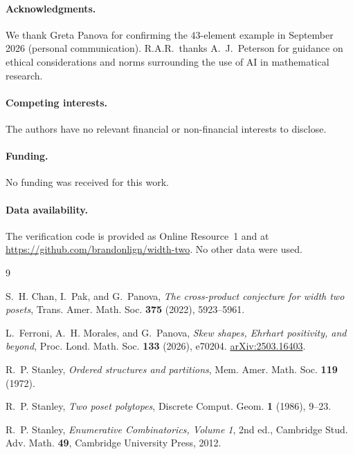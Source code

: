 \documentclass[11pt]{amsart}
\theoremstyle{remark}
\numberwithin{equation}{section}
\begin{document}
\paragraph{Acknowledgments.} We thank Greta Panova for confirming the
$43$-element example in September 2026 (personal communication). R.A.R.\ thanks
A.~J.~Peterson for guidance on ethical considerations and norms surrounding the
use of AI in mathematical research.

\paragraph{Competing interests.} The authors have no relevant financial or non-financial
interests to disclose.

\paragraph{Funding.} No funding was received for this work.

\paragraph{Data availability.} The verification code is provided as Online
Resource~1 and at \url{https://github.com/brandonlign/width-two}. No other data
were used.

\begin{thebibliography}{9}

S.~H. Chan, I.~Pak, and G.~Panova,
\emph{The cross-product conjecture for width two posets},
Trans. Amer. Math. Soc. \textbf{375} (2022), 5923--5961.

L.~Ferroni, A.~H. Morales, and G.~Panova,
\emph{Skew shapes, Ehrhart positivity, and beyond},
Proc. Lond. Math. Soc. \textbf{133} (2026), e70204.
\href{https://arxiv.org/abs/2503.16403}{arXiv:2503.16403}.

R.~P. Stanley,
\emph{Ordered structures and partitions},
Mem. Amer. Math. Soc. \textbf{119} (1972).

R.~P. Stanley,
\emph{Two poset polytopes},
Discrete Comput. Geom. \textbf{1} (1986), 9--23.

R.~P. Stanley,
\emph{Enumerative Combinatorics, Volume 1}, 2nd ed.,
Cambridge Stud. Adv. Math. \textbf{49}, Cambridge University Press, 2012.

\end{thebibliography}
\end{document}
